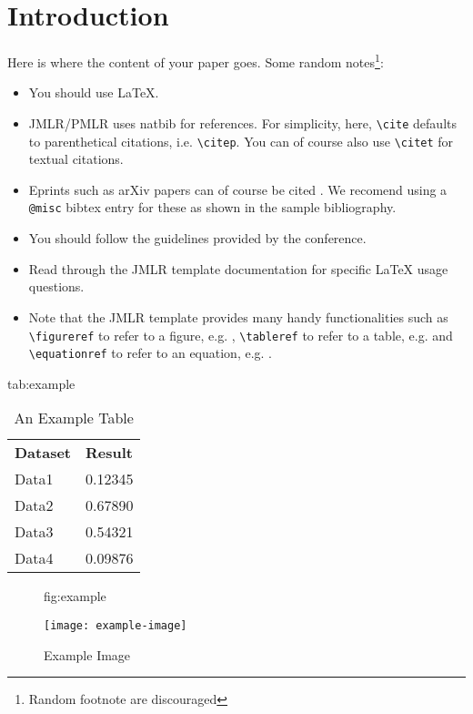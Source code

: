\documentclass{midl} %
\begin{document}
\section{Introduction}

Here is where the content of your paper goes.  Some random
notes\footnote{Random footnote are discouraged}:
\begin{itemize}
\item You should use \LaTeX \cite{Lamport:Book:1989}.
\item JMLR/PMLR uses natbib for references. For simplicity, here, \verb|\cite|  defaults to
  parenthetical citations, i.e. \verb|\citep|. You can of course also use \verb|\citet| for textual citations.
\item Eprints such as arXiv papers can of course be cited \cite{Hinton:arXiv:2015:Distilling}. We recomend using a \verb|@misc| bibtex entry for these as shown in the sample bibliography.
\item You should follow the guidelines provided by the conference.
\item Read through the JMLR template documentation for specific \LaTeX
  usage questions.
\item Note that the JMLR template provides many handy functionalities
such as \verb|\figureref| to refer to a figure,
e.g. ,  \verb|\tableref| to refer to a table,
e.g.  and \verb|\equationref| to refer to an equation,
e.g. .
\end{itemize}

\begin{table}[htbp]
\floatconts
  {tab:example}%
  {\caption{An Example Table}}%
  {\begin{tabular}{ll}
  \bfseries Dataset & \bfseries Result\\
  Data1 & 0.12345\\
  Data2 & 0.67890\\
  Data3 & 0.54321\\
  Data4 & 0.09876
  \end{tabular}}
\end{table}

\begin{figure}[htbp]
\floatconts
  {fig:example}
  {\caption{Example Image}}
  {\texttt{[image: example-image]}}
\end{figure}
\end{document}
